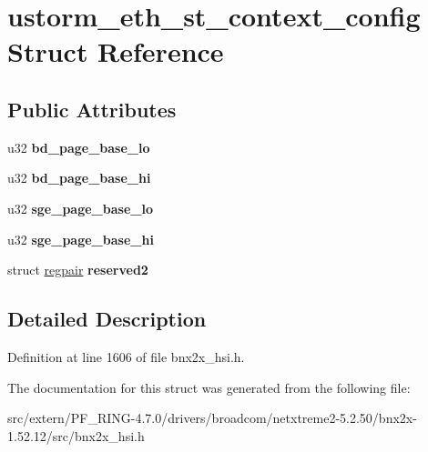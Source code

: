 \hypertarget{structustorm__eth__st__context__config}{
\section{ustorm\_\-eth\_\-st\_\-context\_\-config Struct Reference}
\label{structustorm__eth__st__context__config}
}
\subsection*{Public Attributes}
\begin{DoxyCompactItemize}
\item 
\hypertarget{structustorm__eth__st__context__config_a4d5fd4ad52fb86ce376be61af83450fc}{
u32 {\bfseries bd\_\-page\_\-base\_\-lo}}
\label{structustorm__eth__st__context__config_a4d5fd4ad52fb86ce376be61af83450fc}

\item 
\hypertarget{structustorm__eth__st__context__config_a1e0e3e1a3c5ed46581c98f183185db31}{
u32 {\bfseries bd\_\-page\_\-base\_\-hi}}
\label{structustorm__eth__st__context__config_a1e0e3e1a3c5ed46581c98f183185db31}

\item 
\hypertarget{structustorm__eth__st__context__config_a6631daafdc0f9e8cf20a8eb40021f7d1}{
u32 {\bfseries sge\_\-page\_\-base\_\-lo}}
\label{structustorm__eth__st__context__config_a6631daafdc0f9e8cf20a8eb40021f7d1}

\item 
\hypertarget{structustorm__eth__st__context__config_a91d79e909c4e9f523c7632a5e317fa3e}{
u32 {\bfseries sge\_\-page\_\-base\_\-hi}}
\label{structustorm__eth__st__context__config_a91d79e909c4e9f523c7632a5e317fa3e}

\item 
\hypertarget{structustorm__eth__st__context__config_a6c5d7a4c2af3d43407fdc2d3e408b5bf}{
struct \hyperlink{structregpair}{regpair} {\bfseries reserved2}}
\label{structustorm__eth__st__context__config_a6c5d7a4c2af3d43407fdc2d3e408b5bf}

\end{DoxyCompactItemize}


\subsection{Detailed Description}


Definition at line 1606 of file bnx2x\_\-hsi.h.



The documentation for this struct was generated from the following file:\begin{DoxyCompactItemize}
\item 
src/extern/PF\_\-RING-\/4.7.0/drivers/broadcom/netxtreme2-\/5.2.50/bnx2x-\/1.52.12/src/bnx2x\_\-hsi.h\end{DoxyCompactItemize}
